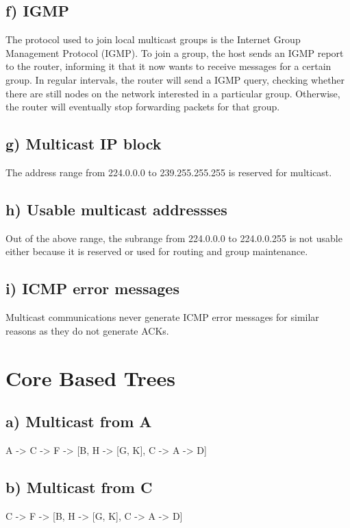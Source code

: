 \documentclass[a4paper, 11 pt, article, accentcolor=tud7b]{tudreport}
\begin{document}
	\subsection*{f) IGMP}
	The protocol used to join local multicast groups is the Internet Group Management Protocol (IGMP). To join a group, the host sends an IGMP report to the router, informing it that it now wants to receive messages for a certain group. In regular intervals, the router will send a IGMP query, checking whether there are still nodes on the network interested in a particular group. Otherwise, the router will eventually stop forwarding packets for that group.
	
	\subsection*{g) Multicast IP block}
	The address range from 224.0.0.0 to 239.255.255.255 is reserved for multicast.
	
	\subsection*{h) Usable multicast addressses}
	Out of the above range, the subrange from 224.0.0.0 to 224.0.0.255 is not usable either because it is reserved or used for routing and group maintenance.
	
	\subsection*{i) ICMP error messages}
	Multicast communications never generate ICMP error messages for similar reasons as they do not generate ACKs.
	
	\section{Core Based Trees}
	
	\subsection*{a) Multicast from A}
	A -> C -> F -> [B, H -> [G, K], C -> A -> D]
	
	\subsection*{b) Multicast from C}
	C -> F -> [B, H -> [G, K], C -> A -> D]
	
	
\end{document}
